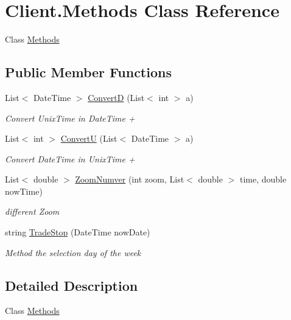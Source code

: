 \hypertarget{class_client_1_1_methods}{}\section{Client.\+Methods Class Reference}
\label{class_client_1_1_methods}


Class \hyperlink{class_client_1_1_methods}{Methods}  


\subsection*{Public Member Functions}
\begin{DoxyCompactItemize}
\item 
List$<$ Date\+Time $>$ \hyperlink{class_client_1_1_methods_a5bdb0a3755830f6d0563350628363822}{ConvertD} (List$<$ int $>$ a)
\begin{DoxyCompactList}\small\item\em Convert Unix\+Time in Date\+Time + \end{DoxyCompactList}\item 
List$<$ int $>$ \hyperlink{class_client_1_1_methods_a39cfc9c9e1cdcc9f69ce35948dc2c040}{ConvertU} (List$<$ Date\+Time $>$ a)
\begin{DoxyCompactList}\small\item\em Convert Date\+Time in Unix\+Time + \end{DoxyCompactList}\item 
List$<$ double $>$ \hyperlink{class_client_1_1_methods_a9c48f83ba6d1f2f7b06b33238ab303ee}{Zoom\+Numver} (int zoom, List$<$ double $>$ time, double now\+Time)
\begin{DoxyCompactList}\small\item\em different Zoom \end{DoxyCompactList}\item 
string \hyperlink{class_client_1_1_methods_abfda303aca077764dcc2f835566a40b5}{Trade\+Stop} (Date\+Time now\+Date)
\begin{DoxyCompactList}\small\item\em Method the selection day of the week \end{DoxyCompactList}\end{DoxyCompactItemize}


\subsection{Detailed Description}
Class \hyperlink{class_client_1_1_methods}{Methods} 



